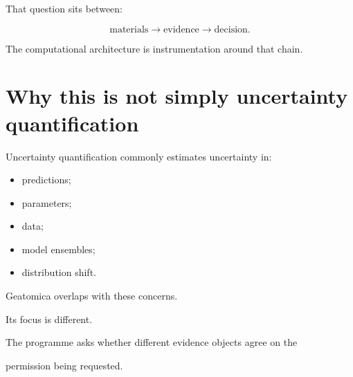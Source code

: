 \documentclass[11pt,a4paper,oneside]{report}
\begin{document}
That question sits between:



\begin{equation}
\text{materials}
\rightarrow
\text{evidence}
\rightarrow
\text{decision}.
\end{equation}



The computational architecture is instrumentation around that chain.





\section{Why this is not simply uncertainty quantification}



Uncertainty quantification commonly estimates uncertainty in:



\begin{itemize}



\item

predictions;



\item

parameters;



\item

data;



\item

model ensembles;



\item

distribution shift.



\end{itemize}



Geatomica overlaps with these concerns.



Its focus is different.



The programme asks whether different evidence objects agree on the

permission being requested.
\end{document}
